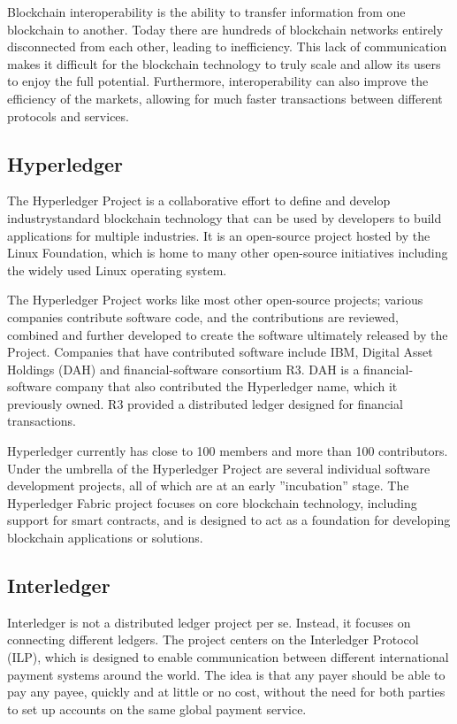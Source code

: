 Blockchain interoperability is the ability to transfer information from one blockchain to another. Today there are hundreds of blockchain networks entirely disconnected from each other, leading to inefficiency. This lack of communication makes it difficult for the blockchain technology to truly scale and allow its users to enjoy the full potential. Furthermore, interoperability can also improve the efficiency of the markets, allowing for much faster transactions between different protocols and services.

\subsection{Hyperledger}

The Hyperledger Project is a collaborative effort to define and develop industrystandard blockchain technology that can be used by developers to build applications for multiple industries. It is an open-source project hosted by the Linux Foundation, which is home to many other open-source initiatives including the widely used Linux operating system.

The Hyperledger Project works like most other open-source projects; various companies contribute software code, and the contributions are reviewed, combined and further developed to create the software ultimately released by the Project. Companies that have contributed software include IBM, Digital Asset Holdings (DAH) and financial-software consortium R3. DAH is a financial-software company that also contributed the Hyperledger name, which it previously owned. R3 provided a distributed ledger designed for financial transactions.

Hyperledger currently has close to 100 members and more than 100 contributors. Under the umbrella of the Hyperledger Project are several individual software development projects, all of which are at an early ”incubation” stage. The Hyperledger Fabric project focuses on core blockchain technology, including support for smart contracts, and is designed to act as a foundation for developing blockchain applications or solutions.

\subsection{Interledger}

Interledger is not a distributed ledger project per se. Instead, it focuses on connecting different ledgers. The project centers on the Interledger Protocol (ILP), which is designed to enable communication between different international payment systems around the world. The idea is that any payer should be able to pay any payee, quickly and at little or no cost, without the need for both parties to set up accounts on the same global payment service.

